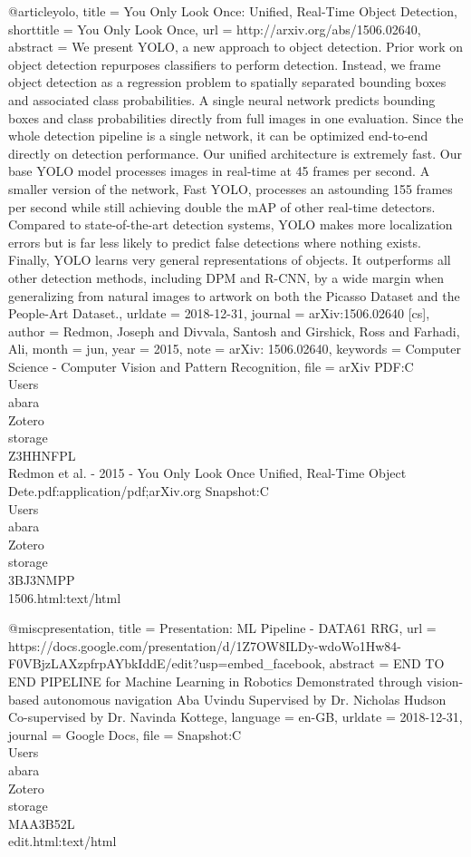 @article{yolo,
	title = {You {Only} {Look} {Once}: {Unified}, {Real}-{Time} {Object} {Detection}},
	shorttitle = {You {Only} {Look} {Once}},
	url = {http://arxiv.org/abs/1506.02640},
	abstract = {We present YOLO, a new approach to object detection. Prior work on object detection repurposes classifiers to perform detection. Instead, we frame object detection as a regression problem to spatially separated bounding boxes and associated class probabilities. A single neural network predicts bounding boxes and class probabilities directly from full images in one evaluation. Since the whole detection pipeline is a single network, it can be optimized end-to-end directly on detection performance. Our unified architecture is extremely fast. Our base YOLO model processes images in real-time at 45 frames per second. A smaller version of the network, Fast YOLO, processes an astounding 155 frames per second while still achieving double the mAP of other real-time detectors. Compared to state-of-the-art detection systems, YOLO makes more localization errors but is far less likely to predict false detections where nothing exists. Finally, YOLO learns very general representations of objects. It outperforms all other detection methods, including DPM and R-CNN, by a wide margin when generalizing from natural images to artwork on both the Picasso Dataset and the People-Art Dataset.},
	urldate = {2018-12-31},
	journal = {arXiv:1506.02640 [cs]},
	author = {Redmon, Joseph and Divvala, Santosh and Girshick, Ross and Farhadi, Ali},
	month = jun,
	year = {2015},
	note = {arXiv: 1506.02640},
	keywords = {Computer Science - Computer Vision and Pattern Recognition},
	file = {arXiv PDF:C\:\\Users\\abara\\Zotero\\storage\\Z3HHNFPL\\Redmon et al. - 2015 - You Only Look Once Unified, Real-Time Object Dete.pdf:application/pdf;arXiv.org Snapshot:C\:\\Users\\abara\\Zotero\\storage\\3BJ3NMPP\\1506.html:text/html}
}

@misc{presentation,
	title = {Presentation: {ML} {Pipeline} - {DATA}61 {RRG}},
	url = {https://docs.google.com/presentation/d/1Z7OW8ILDy-wdoWo1Hw84-F0VBjzLAXzpfrpAYbkIddE/edit?usp=embed_facebook},
	abstract = {END TO END PIPELINE for Machine Learning in Robotics Demonstrated through vision-based autonomous navigation Aba {\textbar} Uvindu Supervised by Dr. Nicholas Hudson Co-supervised by Dr. Navinda Kottege},
	language = {en-GB},
	urldate = {2018-12-31},
	journal = {Google Docs},
	file = {Snapshot:C\:\\Users\\abara\\Zotero\\storage\\MAA3B52L\\edit.html:text/html}
}